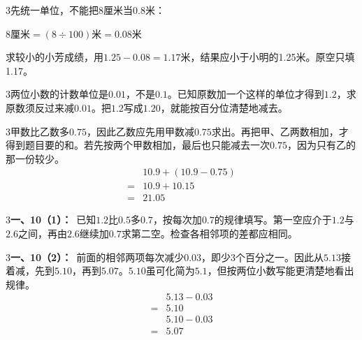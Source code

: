 \documentclass[multi=snippet,border={5bp 20bp 5bp 5bp}]{standalone}
\newenvironment{snippet}[3]{\begin{minipage}{#1bp}\color{answerred}\fontsize{#2}{#3}\selectfont\raggedright}{\end{minipage}}
\begin{document}
\begin{snippet}{505}{11.5}{14}\begin{multicols}{3}\raggedcolumns 先统一单位，不能把8厘米当0.8米：\par\noindent\(\displaystyle 8\text{厘米}=(8\div100)\text{米}=0.08\text{米}\)\allowbreak \par 求较小的小芳成绩，用\(1.25-0.08=1.17\)\allowbreak 米，结果应小于小明的1.25米。原空只填1.17。\end{multicols}\end{snippet}
\begin{snippet}{505}{11.5}{14}\begin{multicols}{3}\raggedcolumns 两位小数的计数单位是\(0.01\)\allowbreak ，不是\(0.1\)\allowbreak 。已知原数加一个这样的单位才得到\(1.2\)\allowbreak ，求原数须反过来减\(0.01\)\allowbreak 。把\(1.2\)\allowbreak 写成\(1.20\)\allowbreak ，就能按百分位清楚地减去。\end{multicols}\end{snippet}
\begin{snippet}{505}{11.5}{14}\begin{multicols}{3}\raggedcolumns 甲数比乙数多\(0.75\)\allowbreak ，因此乙数应先用甲数减\(0.75\)\allowbreak 求出。再把甲、乙两数相加，才得到题目要的和。若先按两个甲数相加，最后也只能减去一次\(0.75\)\allowbreak ，因为只有乙的那一份较少。\[\begin{aligned}&10.9+(10.9-0.75)\\={}&10.9+10.15\\={}&21.05\end{aligned}\]\end{multicols}\end{snippet}
\begin{snippet}{505}{11.5}{14}\begin{multicols}{3}\raggedcolumns \textbf{一、10（1）：}\ 已知\(1.2\)\allowbreak 比\(0.5\)\allowbreak 多\(0.7\)\allowbreak ，按每次加\(0.7\)\allowbreak 的规律填写。第一空应介于\(1.2\)\allowbreak 与\(2.6\)\allowbreak 之间，再由\(2.6\)\allowbreak 继续加\(0.7\)\allowbreak 求第二空。检查各相邻项的差都应相同。\end{multicols}\end{snippet}
\begin{snippet}{505}{11.5}{14}\begin{multicols}{3}\raggedcolumns \textbf{一、10（2）：}\ 前面的相邻两项每次减少\(0.03\)\allowbreak ，即少3个百分之一。因此从\(5.13\)\allowbreak 接着减，先到\(5.10\)\allowbreak ，再到\(5.07\)\allowbreak 。\(5.10\)\allowbreak 虽可化简为\(5.1\)\allowbreak ，但按两位小数写能更清楚地看出规律。\[\begin{aligned}&5.13-0.03\\={}&5.10\\&5.10-0.03\\={}&5.07\end{aligned}\]\end{multicols}\end{snippet}
\end{document}
